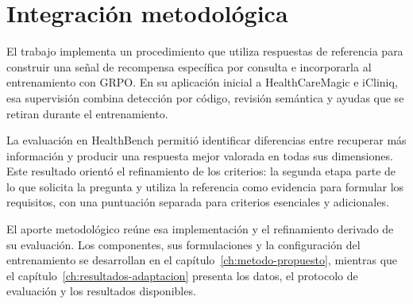 \section{Integración metodológica}
\label{sec:contribuciones-integracion}
El trabajo implementa un procedimiento que utiliza respuestas de referencia para construir una señal de recompensa específica por consulta e incorporarla al entrenamiento con GRPO. En su aplicación inicial a HealthCareMagic e iCliniq, esa supervisión combina detección por código, revisión semántica y ayudas que se retiran durante el entrenamiento.

La evaluación en HealthBench permitió identificar diferencias entre recuperar más información y producir una respuesta mejor valorada en todas sus dimensiones. Este resultado orientó el refinamiento de los criterios: la segunda etapa parte de lo que solicita la pregunta y utiliza la referencia como evidencia para formular los requisitos, con una puntuación separada para criterios esenciales y adicionales.

El aporte metodológico reúne esa implementación y el refinamiento derivado de su evaluación. Los componentes, sus formulaciones y la configuración del entrenamiento se desarrollan en el capítulo~\ref{ch:metodo-propuesto}, mientras que el capítulo~\ref{ch:resultados-adaptacion} presenta los datos, el protocolo de evaluación y los resultados disponibles.
